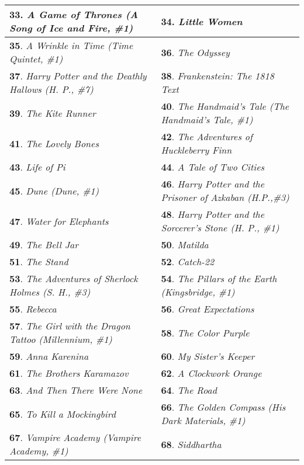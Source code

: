 \begin{table*}[htbp]
{\begin{tabular}{p{3.2in}|p{3.2in}}
\textbf{33}. \textit{{A Game of Thrones (A Song of Ice and Fire, \#1)}} & \textbf{34}. \textit{{Little Women}}\\ \hline
\textbf{35}. \textit{{A Wrinkle in Time (Time Quintet, \#1)}} & \textbf{36}. \textit{{The Odyssey}}\\ \hline
\textbf{37}. \textit{{Harry Potter and the Deathly Hallows (H. P., \#7)}} & \textbf{38}. \textit{{Frankenstein: The 1818 Text}}\\ \hline
\textbf{39}. \textit{{The Kite Runner}} & \textbf{40}. \textit{{The Handmaid’s Tale (The Handmaid's Tale, \#1)}}\\ \hline
\textbf{41}. \textit{{The Lovely Bones}} & \textbf{42}. \textit{{The Adventures of Huckleberry Finn}}\\ \hline
\textbf{43}. \textit{{Life of Pi}} & \textbf{44}. \textit{{A Tale of Two Cities}}\\ \hline
\textbf{45}. \textit{{Dune (Dune, \#1)}} & \textbf{46}. \textit{{Harry Potter and the Prisoner of Azkaban (H.P.,\#3)}}\\ \hline
\textbf{47}. \textit{{Water for Elephants}} & \textbf{48}. \textit{{Harry Potter and the Sorcerer’s Stone (H. P., \#1)}}\\ \hline
\textbf{49}. \textit{{The Bell Jar}} & \textbf{50}. \textit{{Matilda}}\\ \hline
\textbf{51}. \textit{{The Stand}} & \textbf{52}. \textit{{Catch-22}}\\ \hline
\textbf{53}. \textit{{The Adventures of Sherlock Holmes (S. H., \#3)}} & \textbf{54}. \textit{{The Pillars of the Earth (Kingsbridge, \#1)}}\\ \hline
\textbf{55}. \textit{{Rebecca}} & \textbf{56}. \textit{{Great Expectations}}\\ \hline
\textbf{57}. \textit{{The Girl with the Dragon Tattoo (Millennium, \#1)}} & \textbf{58}. \textit{{The Color Purple}}\\ \hline
\textbf{59}. \textit{{Anna Karenina}} & \textbf{60}. \textit{{My Sister’s Keeper}}\\ \hline
\textbf{61}. \textit{{The Brothers Karamazov}} & \textbf{62}. \textit{{A Clockwork Orange}}\\ \hline
\textbf{63}. \textit{{And Then There Were None}} & \textbf{64}. \textit{{The Road}}\\ \hline
\textbf{65}. \textit{{To Kill a Mockingbird}} & \textbf{66}. \textit{{The Golden Compass (His Dark Materials, \#1)}}\\ \hline
\textbf{67}. \textit{{Vampire Academy (Vampire Academy, \#1)}} & \textbf{68}. \textit{{Siddhartha}}\\ \hline

\end{tabular}}
\end{table*}
